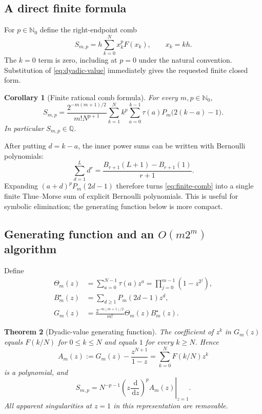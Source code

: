 \documentclass[11pt]{article}
\newtheorem{theorem}{Theorem}[section]
\newtheorem{corollary}[theorem]{Corollary}
\theoremstyle{definition}
\theoremstyle{remark}
\newcommand{\N}{\mathbb N}
\newcommand{\tm}{\tau}
\newcommand{\dd}{\,\mathrm d}
\begin{document}
\subsection{A direct finite formula}

For $p\in\N_0$ define the right-endpoint comb
\begin{equation}\label{eq:Smp}
 S_{m,p}=h\sum_{k=0}^{N}x_k^pF(x_k),
 \qquad x_k=kh.
\end{equation}
The $k=0$ term is zero, including at $p=0$ under the natural convention.
Substitution of \eqref{eq:dyadic-value} immediately gives the requested finite
closed form.

\begin{corollary}[Finite rational comb formula]\label{cor:finite-comb}
For every $m,p\in\N_0$,
\begin{equation}\label{eq:finite-comb}
 S_{m,p}=
 \frac{2^{-m(m+1)/2}}{m!N^{p+1}}
 \sum_{k=1}^{N}k^p
 \sum_{a=0}^{k-1}\tm(a)P_m\bigl(2(k-a)-1\bigr).
\end{equation}
In particular $S_{m,p}\in\mathbb Q$.
\end{corollary}

After putting $d=k-a$, the inner power sums can be written with Bernoulli
polynomials:
\[
 \sum_{d=1}^{L}d^r
 =\frac{B_{r+1}(L+1)-B_{r+1}(1)}{r+1}.
\]
Expanding $(a+d)^pP_m(2d-1)$ therefore turns \eqref{eq:finite-comb} into a
single finite Thue--Morse sum of explicit Bernoulli polynomials.  This is useful
for symbolic elimination; the generating function below is more compact.

\subsection{Generating function and an $O(m2^m)$ algorithm}

Define
\begin{align}
 \Theta_m(z)&=\sum_{a=0}^{N-1}\tm(a)z^a
             =\prod_{j=0}^{m-1}(1-z^{2^j}),\label{eq:theta}\\
 B_m^\star(z)&=\sum_{d\ge1}P_m(2d-1)z^d,\label{eq:Bstar}\\
 G_m(z)&=\frac{2^{-m(m+1)/2}}{m!}\Theta_m(z)B_m^\star(z).\label{eq:Gm}
\end{align}

\begin{theorem}[Dyadic-value generating function]\label{thm:Gm}
The coefficient of $z^k$ in $G_m(z)$ equals $F(k/N)$ for $0\le k\le N$ and
equals $1$ for every $k\ge N$.  Hence
\begin{equation}\label{eq:Am}
 A_m(z):=G_m(z)-\frac{z^{N+1}}{1-z}
       =\sum_{k=0}^{N}F(k/N)z^k
\end{equation}
is a polynomial, and
\begin{equation}\label{eq:log-derivative-comb}
 \boxed{
 S_{m,p}=N^{-p-1}
 \left.\left(z\frac{\dd}{\dd z}\right)^pA_m(z)\right|_{z=1}.}
\end{equation}
All apparent singularities at $z=1$ in this representation are removable.
\end{theorem}
\end{document}
